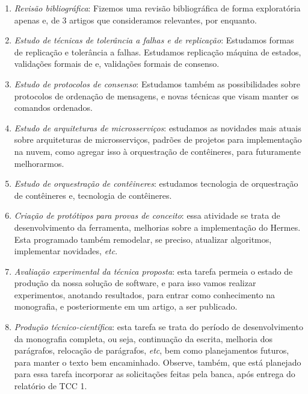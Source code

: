 \begin{enumerate}
\item \textit{Revisão bibliográfica}: Fizemos uma revisão bibliográfica de forma exploratória apenas e, de 3 artigos que consideramos relevantes, por enquanto.


\item \textit{Estudo de técnicas de tolerância a falhas e de replicação}: Estudamos formas de replicação e tolerância a falhas. Estudamos replicação máquina de estados, validações formais de \textcite{hadzilacos-10.5555/866693} e, validações formais de consenso.

\item \textit{Estudo de protocolos de consenso}: Estudamos também as possibilidades sobre protocolos de ordenação de mensagens, e novas técnicas que visam manter os comandos ordenados.

\item \textit{Estudo de arquiteturas de microsserviços}: estudamos as novidades mais atuais sobre arquiteturas de microsserviços, padrões de projetos para implementação na nuvem, como agregar isso à orquestração de contêineres, para futuramente melhorarmos.

\item \textit{Estudo de orquestração de contêineres}: estudamos tecnologia de orquestração de contêineres e, tecnologia de contêineres.

\item \textit{Criação de protótipos para provas de conceito}: essa atividade se trata de desenvolvimento da ferramenta, melhorias sobre a implementação do Hermes. Esta programado também remodelar, se preciso, atualizar algoritmos, implementar novidades, \textit{etc}.

\item \textit{Avaliação experimental da técnica proposta}: esta tarefa permeia o estado de produção da nossa solução de software, e para isso vamos realizar experimentos, anotando resultados, para entrar como conhecimento na monografia, e posteriormente em um artigo, a ser publicado.

\item \textit{Produção técnico-científica}: esta tarefa se trata do período de desenvolvimento da monografia completa, ou seja, continuação da escrita, melhoria dos parágrafos, relocação de parágrafos, \textit{etc}, bem como planejamentos futuros, para manter o texto bem encaminhado. Observe, também, que está planejado para essa tarefa incorporar as solicitações feitas pela banca, após entrega do relatório de TCC 1.


\end{enumerate}
